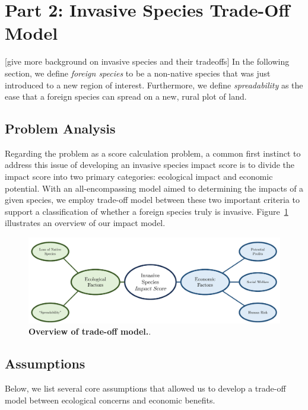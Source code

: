 \section{Part 2: Invasive Species Trade-Off Model}

[give more background on invasive species and their tradeoffs]
In the following section, we define \textit{foreign species} to be a non-native species that was just introduced to a new region of interest. Furthermore, we define \textit{spreadability} as the ease that a foreign species can spread on a new, rural plot of land.

\subsection{Problem Analysis}

Regarding the problem as a score calculation problem, a common first instinct to address this issue of developing an invasive species impact score is to divide the impact score into two primary categories: ecological impact and economic potential. With an all-encompassing model aimed to determining the impacts of a given species, we employ trade-off model between these two important criteria to support a classification of whether a foreign species truly is invasive. Figure~\ref{fig:invasiveimpactbrainstorm} illustrates an overview of our impact model.

\begin{figure}[h!]
\centering
    \includegraphics[scale=0.5]{figures/invasivespeciesimpactscore.pdf}
    \captionsetup{width=0.9\textwidth}
    \caption{\textbf{Overview of trade-off model.}.}
    \label{fig:invasiveimpactbrainstorm}
\end{figure}

\subsection {Assumptions}

Below, we list several core assumptions that allowed us to develop a trade-off model between ecological concerns and economic benefits. 

